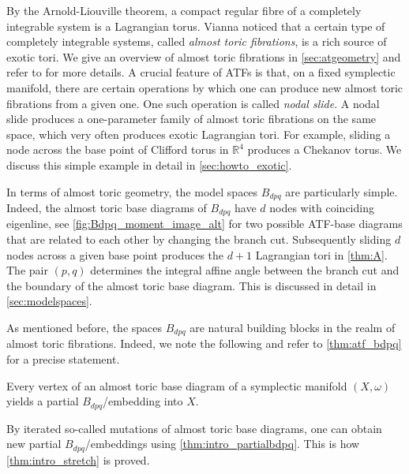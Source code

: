 \documentclass[AIF,Unicode,manuscript]{cedram}
\begin{document}
By the Arnold-Liouville theorem, a compact regular fibre of a completely integrable system is a Lagrangian torus. Vianna \cite{Via16,Via17} noticed that a certain type of completely integrable systems, called \emph{almost toric fibrations}, is a rich source of exotic tori. We give an overview of almost toric fibrations in \cref{sec:atgeometry} and refer to \cite{evans2021atfs} for more details. A crucial feature of ATFs is that, on a fixed symplectic manifold, there are certain operations by which one can produce new almost toric fibrations from a given one. One such operation is called \emph{nodal slide}. A nodal slide produces a one-parameter family of almost toric fibrations on the same space, which very often produces exotic Lagrangian tori. For example, sliding a node across the base point of Clifford torus in $\mathbb{R}^4$ produces a Chekanov torus. We discuss this simple example in detail in \cref{sec:howto_exotic}.

In terms of almost toric geometry, the model spaces $B_{dpq}$ are particularly simple.
Indeed, the almost toric base diagrams of $B_{dpq}$ have $d$ nodes with coinciding eigenline, see \cref{fig:Bdpq_moment_image_alt} for two possible ATF-base diagrams that are related to each other by changing the branch cut. Subsequently sliding $d$ nodes across a given base point produces the $d+1$ Lagrangian tori in \cref{thm:A}.
The pair $(p,q)$ determines the integral affine angle between the branch cut and the boundary of the almost toric base diagram.
This is discussed in detail in \cref{sec:modelspaces}.

As mentioned before, the spaces $B_{dpq}$ are natural building blocks in the realm of almost toric fibrations.
Indeed, we note the following and refer to \cref{thm:atf_bdpq} for a precise statement.

\begin{proposition}
    \label{thm:intro_partialbdpq}
    Every vertex of an almost toric base diagram of a symplectic manifold $(X,\omega)$ yields a partial $B_{dpq}$\-/embedding into $X$. 
\end{proposition}

By iterated so-called mutations of almost toric base diagrams, one can obtain new partial $B_{dpq}$\-/embeddings using \cref{thm:intro_partialbdpq}.
This is how \cref{thm:intro_stretch} is proved.
\end{document}
